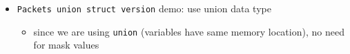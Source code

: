 \begin{enumerate}
\begin{itemize}
    \item \verb|Packets union struct version| demo: use union data type

    \begin{itemize}
        \item since we are using \verb|union| (variables have same memory location), no need for mask values
    \end{itemize}

    
\end{itemize}


\end{enumerate}



